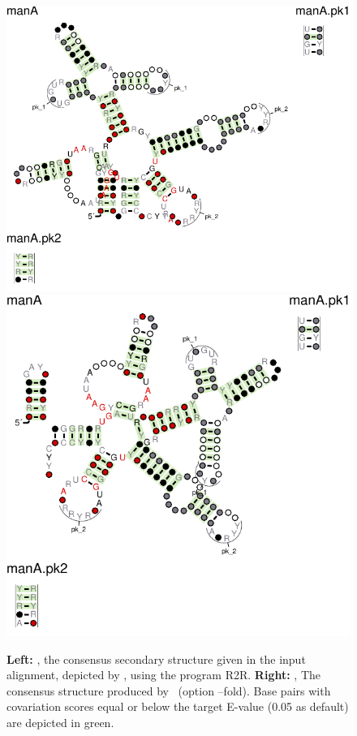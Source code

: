  \begin{figure}[h]
   \includegraphics[scale=0.7]{manA_R2R.pdf} 
  \includegraphics[scale=0.7]{manA_fold_R2R.pdf} 
  \caption{\small\textbf{Left:}
    , the consensus
    secondary structure given in the input alignment, depicted by
    \rscape, using the program R2R.  \textbf{Right:}
    , The consensus
    structure produced by \rscape\ (option --fold).  Base pairs with
    covariation scores equal or below the target E-value (0.05 as
    default) are depicted in green.  }
 \label{fig:manA_r2r}
 \end{figure}
 

